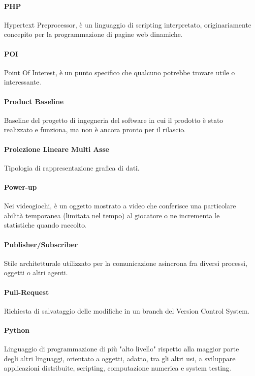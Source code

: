 \documentclass[]{article}
\begin{document}
	\paragraph*{PHP}
	Hypertext Preprocessor, è un linguaggio di scripting interpretato, originariamente concepito per la programmazione di pagine web dinamiche.

	\paragraph*{POI}
	Point Of Interest, è un punto specifico che qualcuno potrebbe trovare utile o interessante.

	\paragraph*{Product Baseline}
	Baseline del progetto di ingegneria del software in cui il prodotto è stato realizzato e funziona, ma non è ancora pronto per il rilascio.

	\paragraph*{Proiezione Lineare Multi Asse}
	Tipologia di rappresentazione grafica di dati.

	\paragraph*{Power-up}
	Nei videogiochi, è un oggetto mostrato a video che conferisce una particolare abilità temporanea (limitata nel tempo) al giocatore o ne incrementa le statistiche quando raccolto.

	\paragraph*{Publisher/Subscriber}
	Stile architetturale utilizzato per la comunicazione asincrona fra diversi processi, oggetti o altri agenti.

	\paragraph*{Pull-Request}
	Richiesta di salvataggio delle modifiche in un branch del Version Control System.

	\paragraph*{Python}
	Linguaggio di programmazione di più "alto livello" rispetto alla maggior parte degli altri linguaggi, orientato a oggetti, adatto, tra gli altri usi, a sviluppare applicazioni distribuite, scripting, computazione numerica e system testing.
\end{document}
